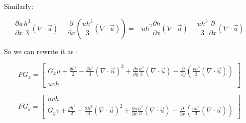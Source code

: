 \documentclass[12pt]{article}
\begin{document}
Similarly:

\[ \frac{\partial u}{\partial x}\frac{h^3}{3} \left(\nabla \cdot \vec{u}\right) - \frac{\partial}{\partial x}\left(\frac{uh^3}{3} \left(\nabla \cdot \vec{u}\right)\right) = -uh^2\frac{\partial h}{\partial x}\left(\nabla \cdot \vec{u}\right) - \frac{uh^3}{3} \frac{\partial }{\partial x} \left(\nabla \cdot \vec{u}\right)   \]

So we can rewrite it as :

\[FG_x = \left[\begin{array}{c}
G_xu + \frac{gh^2}{2} - \frac{2h^3}{3}\left(\nabla \cdot \vec{u}\right)^2 + \frac{\partial v}{\partial y}\frac{h^3}{3} \left(\nabla \cdot \vec{u}\right) - \frac{\partial}{\partial y}\left(\frac{vh^3}{3} \left(\nabla \cdot \vec{u}\right)\right) \\
uvh
\end{array}\right] \]

\[FG_y = \left[\begin{array}{c}
uvh\\
G_yv+ \frac{gh^2}{2} - \frac{2h^3}{3}\left(\nabla \cdot \vec{u}\right)^2 + \frac{\partial u}{\partial x}\frac{h^3}{3} \left(\nabla \cdot \vec{u}\right) - \frac{\partial}{\partial x}\left(\frac{uh^3}{3} \left(\nabla \cdot \vec{u}\right)\right)
\end{array}\right] \]
\end{document}
